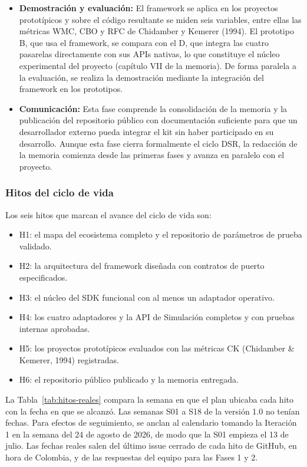 \begin{itemize}
  \item \textbf{Demostración y evaluación:} El framework se aplica en los proyectos prototípicos y sobre el código resultante se miden seis variables, entre ellas las métricas WMC, CBO y RFC de Chidamber y Kemerer (1994). El prototipo B, que usa el framework, se compara con el D, que integra las cuatro pasarelas directamente con sus APIs nativas, lo que constituye el núcleo experimental del proyecto (capítulo VII de la memoria). De forma paralela a la evaluación, se realiza la demostración mediante la integración del framework en los prototipos.
  \item \textbf{Comunicación:} Esta fase comprende la consolidación de la memoria y la publicación del repositorio público con documentación suficiente para que un desarrollador externo pueda integrar el kit sin haber participado en su desarrollo. Aunque esta fase cierra formalmente el ciclo DSR, la redacción de la memoria comienza desde las primeras fases y avanza en paralelo con el proyecto.
\end{itemize}

\subsubsection{Hitos del ciclo de vida}

Los seis hitos que marcan el avance del ciclo de vida son:

\begin{itemize}
  \item H1: el mapa del ecosistema completo y el repositorio de parámetros de prueba validado.
  \item H2: la arquitectura del framework diseñada con contratos de puerto especificados.
  \item H3: el núcleo del SDK funcional con al menos un adaptador operativo.
  \item H4: los cuatro adaptadores y la API de Simulación completos y con pruebas internas aprobadas.
  \item H5: los proyectos prototípicos evaluados con las métricas CK (Chidamber \& Kemerer, 1994) registradas.
  \item H6: el repositorio público publicado y la memoria entregada.
\end{itemize}

La Tabla~\ref{tab:hitos-reales} compara la semana en que el plan ubicaba cada hito con la fecha en que se alcanzó. Las semanas S01 a S18 de la versión 1.0 no tenían fechas. Para efectos de seguimiento, se anclan al calendario tomando la Iteración 1 en la semana del 24 de agosto de 2026, de modo que la S01 empieza el 13 de julio. Las fechas reales salen del último issue cerrado de cada hito de GitHub, en hora de Colombia, y de las respuestas del equipo para las Fases 1 y 2.

